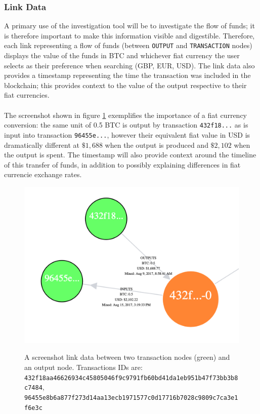 \subsubsection{Link Data}
A primary use of the investigation tool will be to investigate the flow of funds; it is therefore important to make this information visible and digestible. Therefore, each link representing a flow of funds (between \texttt{OUTPUT} and \texttt{TRANSACTION} nodes) displays the value of the funds in BTC and whichever fiat currency the user selects as their preference when searching (GBP, EUR, USD). The link data also provides a timestamp representing the time the transaction was included in the blockchain; this provides context to the value of the output respective to their fiat currencies. 
\\\\
The screenshot shown in figure \ref{fig:link-data} exemplifies the importance of a fiat currency conversion: the same unit of 0.5 BTC is output by transaction \texttt{432f18...} as is input into transaction \texttt{96455e...}, however their equivalent fiat value in USD is dramatically different at $\$1,688$ when the output is produced and $\$2,102$ when the output is spent. The timestamp will also provide context around the timeline of this transfer of funds, in addition to possibly explaining differences in fiat currencie exchange rates.

\begin{figure}[h!]
  \centering
  \includegraphics[width = 15cm]{./figures/ui-screenshots/link-data}\\[0.5cm] 
  \caption{A screenshot link data between two transaction nodes (green) and an output node. 
  Transactions IDs are: \texttt{432f18aa46626934c45805046f9c9791fb60bd41da1eb951b47f73bb3b8c7484},\\\texttt{96455e8b6a877f273d14aa13ecb1971577c0d17716b7028c9809c7ca3e1f6e3c}}
  \label{fig:link-data}
\end{figure}

